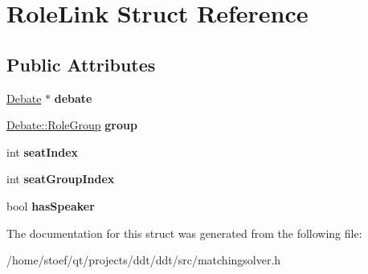 \hypertarget{structRoleLink}{\section{Role\-Link Struct Reference}
\label{structRoleLink}
}
\subsection*{Public Attributes}
\begin{DoxyCompactItemize}
\item 
\hypertarget{structRoleLink_abcc31a77bf33b9efe7c5f48485c4d370}{\hyperlink{classDebate}{Debate} $\ast$ {\bfseries debate}}\label{structRoleLink_abcc31a77bf33b9efe7c5f48485c4d370}

\item 
\hypertarget{structRoleLink_ab9e7502c40c24b40d7a63dd534a739e4}{\hyperlink{classDebate_ae9871a36a2f3de7a7da8922d70fbece4}{Debate\-::\-Role\-Group} {\bfseries group}}\label{structRoleLink_ab9e7502c40c24b40d7a63dd534a739e4}

\item 
\hypertarget{structRoleLink_ae1cd0be803e73cab33405554db2ebc76}{int {\bfseries seat\-Index}}\label{structRoleLink_ae1cd0be803e73cab33405554db2ebc76}

\item 
\hypertarget{structRoleLink_af68987a39ab52ada8783cc27ef1d8f6f}{int {\bfseries seat\-Group\-Index}}\label{structRoleLink_af68987a39ab52ada8783cc27ef1d8f6f}

\item 
\hypertarget{structRoleLink_aaa7115d2c38c602e317435bdc81b1cd4}{bool {\bfseries has\-Speaker}}\label{structRoleLink_aaa7115d2c38c602e317435bdc81b1cd4}

\end{DoxyCompactItemize}


The documentation for this struct was generated from the following file\-:\begin{DoxyCompactItemize}
\item 
/home/stoef/qt/projects/ddt/ddt/src/matchingsolver.\-h\end{DoxyCompactItemize}
